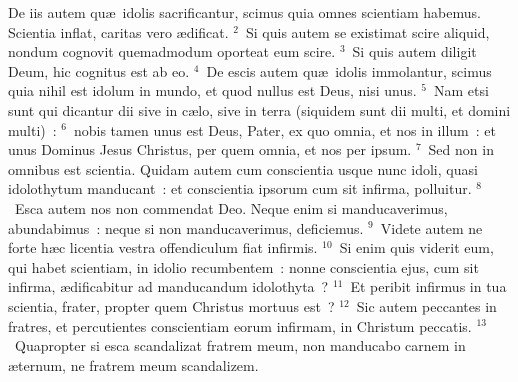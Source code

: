 \lettrine[lines=10,image=true,loversize=0.05,lraise=-0.03]{D}{}e iis autem qu\ae\ idolis sacrificantur, scimus quia omnes scientiam habemus. Scientia inflat, caritas vero \ae dificat.
${}^{2}$~Si quis autem se existimat scire aliquid, nondum cognovit quemadmodum oporteat eum scire.
${}^{3}$~Si quis autem diligit Deum, hic cognitus est ab eo.
${}^{4}$~De escis autem qu\ae\ idolis immolantur, scimus quia nihil est idolum in mundo, et quod nullus est Deus, nisi unus.
${}^{5}$~Nam etsi sunt qui dicantur dii sive in c\ae lo, sive in terra (siquidem sunt dii multi, et domini multi)~:
${}^{6}$~nobis tamen unus est Deus, Pater, ex quo omnia, et nos in illum~: et unus Dominus Jesus Christus, per quem omnia, et nos per ipsum.
${}^{7}$~Sed non in omnibus est scientia. Quidam autem cum conscientia usque nunc idoli, quasi idolothytum manducant~: et conscientia ipsorum cum sit infirma, polluitur.
${}^{8}$~Esca autem nos non commendat Deo. Neque enim si manducaverimus, abundabimus~: neque si non manducaverimus, deficiemus.
${}^{9}$~Videte autem ne forte h\ae c licentia vestra offendiculum fiat infirmis.
${}^{10}$~Si enim quis viderit eum, qui habet scientiam, in idolio recumbentem~: nonne conscientia ejus, cum sit infirma, \ae dificabitur ad manducandum idolothyta~?
${}^{11}$~Et peribit infirmus in tua scientia, frater, propter quem Christus mortuus est~?
${}^{12}$~Sic autem peccantes in fratres, et percutientes conscientiam eorum infirmam, in Christum peccatis.
${}^{13}$~Quapropter si esca scandalizat fratrem meum, non manducabo carnem in \ae ternum, ne fratrem meum scandalizem.

